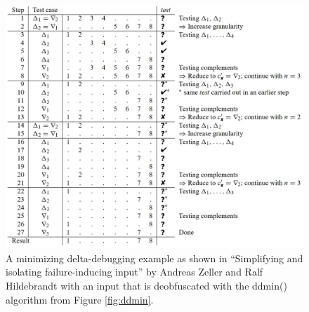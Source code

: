 \begin{figure}
	\centering
	\includegraphics[width=1.0\textwidth]{images/ddminExampleFromPaper5}
	\caption{A minimizing delta-debugging example as shown in “Simplifying and isolating failure-inducing input” by Andreas Zeller and Ralf Hildebrandt \cite{5zeller2002simplifyingIsolatingFailure-inducing} with an input that is deobfuscated with the ddmin() algorithm from Figure \ref{fig:ddmin}.}
	\label{fig:ddminExample}
\end{figure}

